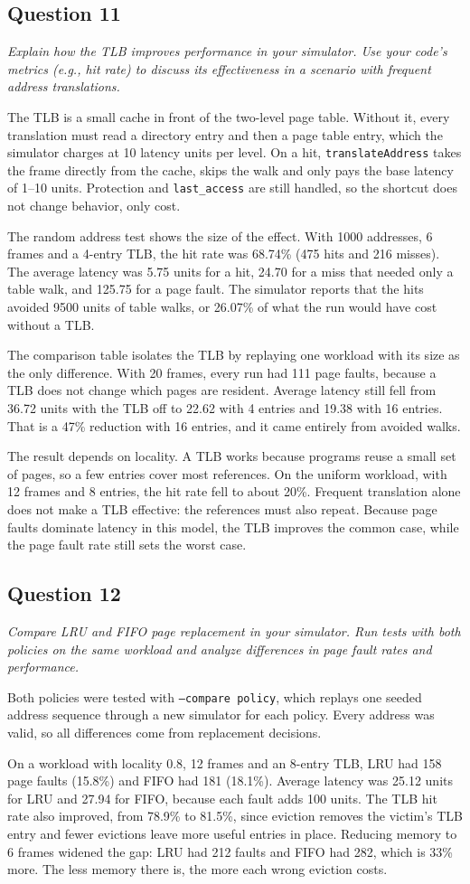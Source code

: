 \documentclass[11pt]{article}
\newcommand{\question}[2]{\subsection*{Question #1}\noindent\textit{#2}\par\medskip}
\newcommand{\code}[1]{\texttt{#1}}
\begin{document}
\question{11}{Explain how the TLB improves performance in your simulator. Use your code's metrics (e.g., hit rate) to discuss its effectiveness in a scenario with frequent address translations.}
The TLB is a small cache in front of the two-level page table. Without it, every
translation must read a directory entry and then a page table entry, which the
simulator charges at 10 latency units per level. On a hit, \code{translateAddress}
takes the frame directly from the cache, skips the walk and only pays the base
latency of 1--10 units. Protection and \code{last\_access} are still handled, so
the shortcut does not change behavior, only cost.

The random address test shows the size of the effect. With 1000 addresses, 6
frames and a 4-entry TLB, the hit rate was 68.74\% (475 hits and 216 misses). The
average latency was 5.75 units for a hit, 24.70 for a miss that needed only a
table walk, and 125.75 for a page fault. The simulator reports that the hits
avoided 9500 units of table walks, or 26.07\% of what the run would have cost
without a TLB.

The comparison table isolates the TLB by replaying one workload with its size as
the only difference. With 20 frames, every run had 111 page faults, because a TLB
does not change which pages are resident. Average latency still fell from 36.72
units with the TLB off to 22.62 with 4 entries and 19.38 with 16 entries. That is
a 47\% reduction with 16 entries, and it came entirely from avoided walks.

The result depends on locality. A TLB works because programs reuse a small set of
pages, so a few entries cover most references. On the uniform workload, with 12
frames and 8 entries, the hit rate fell to about 20\%. Frequent translation alone
does not make a TLB effective: the references must also repeat. Because page
faults dominate latency in this model, the TLB improves the common case, while
the page fault rate still sets the worst case.

\question{12}{Compare LRU and FIFO page replacement in your simulator. Run tests with both policies on the same workload and analyze differences in page fault rates and performance.}
Both policies were tested with \code{--compare policy}, which replays one seeded
address sequence through a new simulator for each policy. Every address was
valid, so all differences come from replacement decisions.

On a workload with locality 0.8, 12 frames and an 8-entry TLB, LRU had 158 page
faults (15.8\%) and FIFO had 181 (18.1\%). Average latency was 25.12 units for LRU
and 27.94 for FIFO, because each fault adds 100 units. The TLB hit rate also
improved, from 78.9\% to 81.5\%, since eviction removes the victim's TLB entry and
fewer evictions leave more useful entries in place. Reducing memory to 6 frames
widened the gap: LRU had 212 faults and FIFO had 282, which is 33\% more. The less
memory there is, the more each wrong eviction costs.
\end{document}
